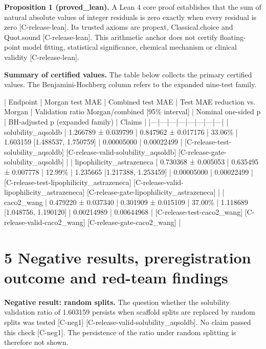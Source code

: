\documentclass[10pt,twocolumn]{article}
\begin{document}
\textbf{Proposition 1 (proved_lean).} A Lean 4 core proof establishes that the sum of natural absolute values of integer residuals is zero exactly when every residual is zero {\scriptsize[C-release-lean]}. Its trusted axioms are propext, Classical.choice and Quot.sound {\scriptsize[C-release-lean]}. This arithmetic anchor does not certify floating-point model fitting, statistical significance, chemical mechanism or clinical validity {\scriptsize[C-release-lean]}.

\textbf{Summary of certified values.} The table below collects the primary certified values. The Benjamini-Hochberg column refers to the expanded nine-test family.

| Endpoint | Morgan test MAE | Combined test MAE | Test MAE reduction vs. Morgan | Validation ratio Morgan/combined [95\% interval] | Nominal one-sided p | BH-adjusted p (expanded family) | Claims |
|---|---|---|---|---|---|---|---|
| solubility_aqsoldb | 1.266789 ± 0.039799 | 0.847962 ± 0.017176 | 33.06\% | 1.603159 [1.488537, 1.750759] | 0.00005000 | 0.00022499 | {\scriptsize[C-release-test-solubility\_aqsoldb]} {\scriptsize[C-release-valid-solubility\_aqsoldb]} {\scriptsize[C-release-gate-solubility\_aqsoldb]} |
| lipophilicity_astrazeneca | 0.730368 ± 0.005053 | 0.635495 ± 0.007778 | 12.99\% | 1.235665 [1.217388, 1.253459] | 0.00005000 | 0.00022499 | {\scriptsize[C-release-test-lipophilicity\_astrazeneca]} {\scriptsize[C-release-valid-lipophilicity\_astrazeneca]} {\scriptsize[C-release-gate-lipophilicity\_astrazeneca]} |
| caco2_wang | 0.479220 ± 0.037340 | 0.301909 ± 0.015109 | 37.00\% | 1.118689 [1.048756, 1.190120] | 0.00214989 | 0.00644968 | {\scriptsize[C-release-test-caco2\_wang]} {\scriptsize[C-release-valid-caco2\_wang]} {\scriptsize[C-release-gate-caco2\_wang]} |

\section{5 Negative results, preregistration outcome and red-team findings}

\textbf{Negative result: random splits.} The question whether the solubility validation ratio of 1.603159 persists when scaffold splits are replaced by random splits was tested {\scriptsize[C-neg1]} {\scriptsize[C-release-valid-solubility\_aqsoldb]}. No claim passed this check {\scriptsize[C-neg1]}. The persistence of the ratio under random splitting is therefore not shown.
\end{document}
